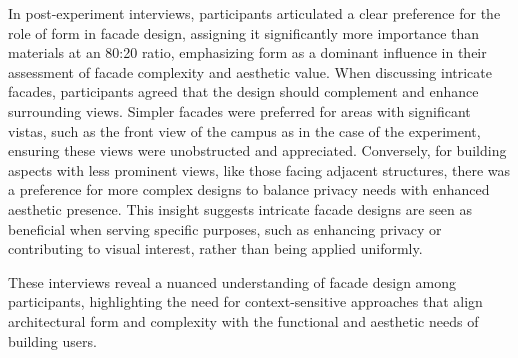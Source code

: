 In post-experiment interviews, participants articulated a clear preference for the role of form in facade design, assigning it significantly more importance than materials at an 80:20 ratio, emphasizing form as a dominant influence in their assessment of facade complexity and aesthetic value.
When discussing intricate facades, participants agreed that the design should complement and enhance surrounding views.
Simpler facades were preferred for areas with significant vistas, such as the front view of the campus as in the case of the experiment, ensuring these views were unobstructed and appreciated.
Conversely, for building aspects with less prominent views, like those facing adjacent structures, there was a preference for more complex designs to balance privacy needs with enhanced aesthetic presence.
This insight suggests intricate facade designs are seen as beneficial when serving specific purposes, such as enhancing privacy or contributing to visual interest, rather than being applied uniformly.

These interviews reveal a nuanced understanding of facade design among participants, highlighting the need for context-sensitive approaches that align architectural form and complexity with the functional and aesthetic needs of building users.









